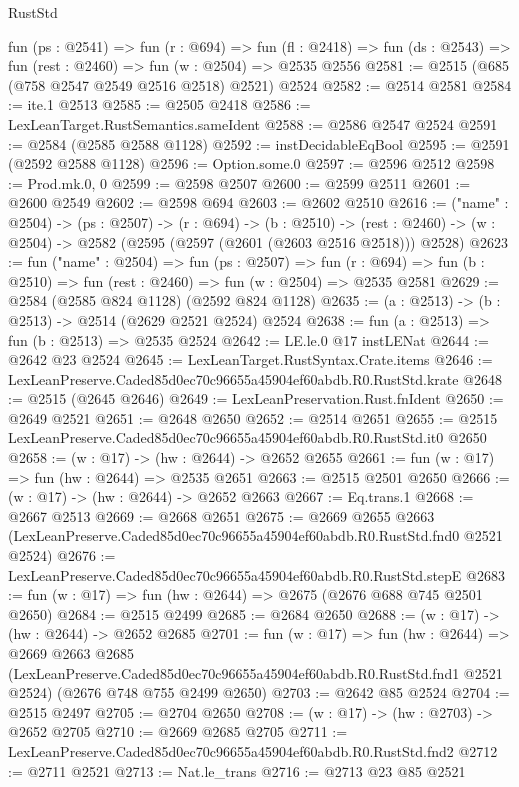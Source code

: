 \begin{lexlean}{RustStd}
\begin{coremodule}
  fun (ps : @2541) =>
  fun (r : @694) =>
  fun (fl : @2418) => fun (ds : @2543) => fun (rest : @2460) => fun (w : @2504) => @2535 @2556
@2581 := @2515 (@685 (@758 @2547 @2549 @2516 @2518) @2521) @2524
@2582 := @2514 @2581
@2584 := ite.{1} @2513
@2585 := @2505 @2418
@2586 := LexLeanTarget.RustSemantics.sameIdent
@2588 := @2586 @2547 @2524
@2591 := @2584 (@2585 @2588 @1128)
@2592 := instDecidableEqBool
@2595 := @2591 (@2592 @2588 @1128)
@2596 := Option.some.{0}
@2597 := @2596 @2512
@2598 := Prod.mk.{0, 0}
@2599 := @2598 @2507
@2600 := @2599 @2511
@2601 := @2600 @2549
@2602 := @2598 @694
@2603 := @2602 @2510
@2616 := ("name" : @2504) ->
  (ps : @2507) ->
  (r : @694) ->
  (b : @2510) ->
  (rest : @2460) -> (w : @2504) -> @2582 (@2595 (@2597 (@2601 (@2603 @2516 @2518))) @2528)
@2623 := fun ("name" : @2504) =>
  fun (ps : @2507) =>
  fun (r : @694) => fun (b : @2510) => fun (rest : @2460) => fun (w : @2504) => @2535 @2581
@2629 := @2584 (@2585 @824 @1128) (@2592 @824 @1128)
@2635 := (a : @2513) -> (b : @2513) -> @2514 (@2629 @2521 @2524) @2524
@2638 := fun (a : @2513) => fun (b : @2513) => @2535 @2524
@2642 := LE.le.{0} @17 instLENat
@2644 := @2642 @23 @2524
@2645 := LexLeanTarget.RustSyntax.Crate.items
@2646 := LexLeanPreserve.Caded85d0ec70c96655a45904ef60abdb.R0.RustStd.krate
@2648 := @2515 (@2645 @2646)
@2649 := LexLeanPreservation.Rust.fnIdent
@2650 := @2649 @2521
@2651 := @2648 @2650
@2652 := @2514 @2651
@2655 := @2515 LexLeanPreserve.Caded85d0ec70c96655a45904ef60abdb.R0.RustStd.it0 @2650
@2658 := (w : @17) -> (hw : @2644) -> @2652 @2655
@2661 := fun (w : @17) => fun (hw : @2644) => @2535 @2651
@2663 := @2515 @2501 @2650
@2666 := (w : @17) -> (hw : @2644) -> @2652 @2663
@2667 := Eq.trans.{1}
@2668 := @2667 @2513
@2669 := @2668 @2651
@2675 := @2669
    @2655
    @2663
    (LexLeanPreserve.Caded85d0ec70c96655a45904ef60abdb.R0.RustStd.fnd0 @2521 @2524)
@2676 := LexLeanPreserve.Caded85d0ec70c96655a45904ef60abdb.R0.RustStd.stepE
@2683 := fun (w : @17) => fun (hw : @2644) => @2675 (@2676 @688 @745 @2501 @2650)
@2684 := @2515 @2499
@2685 := @2684 @2650
@2688 := (w : @17) -> (hw : @2644) -> @2652 @2685
@2701 := fun (w : @17) =>
  fun (hw : @2644) =>
  @2669
    @2663
    @2685
    (LexLeanPreserve.Caded85d0ec70c96655a45904ef60abdb.R0.RustStd.fnd1 @2521 @2524)
    (@2676 @748 @755 @2499 @2650)
@2703 := @2642 @85 @2524
@2704 := @2515 @2497
@2705 := @2704 @2650
@2708 := (w : @17) -> (hw : @2703) -> @2652 @2705
@2710 := @2669 @2685 @2705
@2711 := LexLeanPreserve.Caded85d0ec70c96655a45904ef60abdb.R0.RustStd.fnd2
@2712 := @2711 @2521
@2713 := Nat.le_trans
@2716 := @2713 @23 @85 @2521

\end{coremodule}
\end{lexlean}
